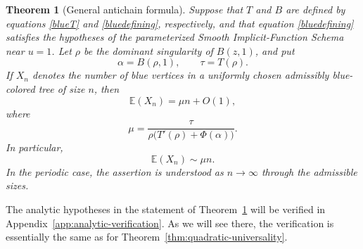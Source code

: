 \documentclass[11pt, onesided]{amsart}
\newtheorem{theorem}{Theorem}[section]
\theoremstyle{remark}
\begin{document}
\begin{theorem}[General antichain formula]\label{thm:bluegeneral}
Suppose that $T$ and $B$ are defined by equations \eqref{blueT} and
\eqref{bluedefining}, respectively, and that equation \eqref{bluedefining} satisfies the hypotheses
of the parameterized Smooth Implicit-Function Schema near $u=1$.  Let $\rho$
be the dominant singularity of $B(z,1)$, and put
\[
\alpha=B(\rho,1),\qquad \tau=T(\rho).
\]
If $X_n$ denotes the number of blue vertices in a uniformly chosen
admissibly blue-colored tree of size $n$, then
\[
\mathbb E(X_n)=\mu n+O(1),
\]
where
\begin{equation}\label{blueconstant}
{
\mu=
\frac{\tau}
{\rho\bigl(T'(\rho)+\Phi(\alpha)\bigr)}.
}
\end{equation}
In particular,
\[
\mathbb E(X_n)\sim \mu n.
\]
In the periodic case, the assertion is understood as $n\to\infty$ through
the admissible sizes.
\end{theorem}

The analytic hypotheses in the statement of Theorem~\ref{thm:bluegeneral}
will be verified in Appendix~\ref{app:analytic-verification}.  As we will
see there, the verification is essentially the same as for
Theorem~\ref{thm:quadratic-universality}.
\end{document}
